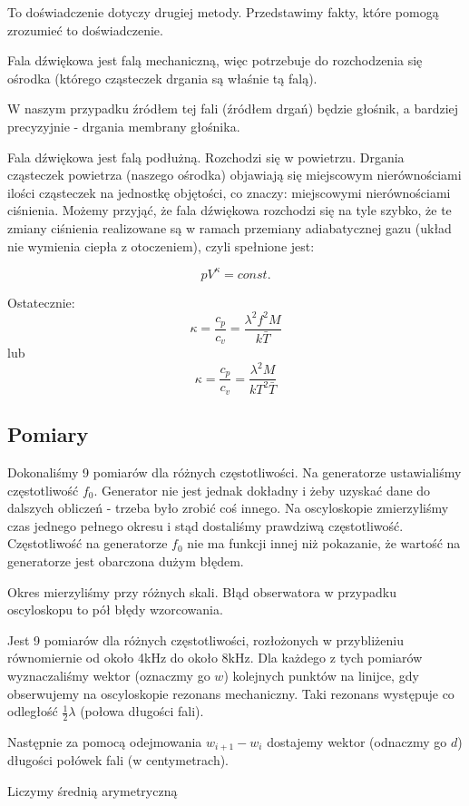 \documentclass[12pt,a4paper]{article}
\begin{document}
To doświadczenie dotyczy drugiej metody. Przedstawimy fakty, które pomogą zrozumieć to doświadczenie.


Fala dźwiękowa jest falą mechaniczną, więc potrzebuje do rozchodzenia się ośrodka (którego cząsteczek drgania są właśnie tą falą).  

W naszym przypadku źródłem tej fali (źródłem drgań) będzie głośnik, a bardziej precyzyjnie - drgania membrany głośnika. 

Fala dźwiękowa jest falą podłużną. Rozchodzi się w powietrzu. Drgania cząsteczek powietrza (naszego ośrodka) objawiają się miejscowym nierównościami ilości cząsteczek na jednostkę objętości, co znaczy: miejscowymi nierównościami ciśnienia.
Możemy przyjąć, że fala dźwiękowa rozchodzi się na tyle szybko, że te zmiany ciśnienia realizowane są w ramach przemiany adiabatycznej gazu (układ nie wymienia ciepła z otoczeniem), czyli spełnione jest: 

$$
pV^\kappa = const.
$$


Ostatecznie:
$$
\kappa = \frac{c_p}{c_v} = \frac{\lambda^2 f^2 M}{k\bar{T}}
$$
lub
$$
\kappa = \frac{c_p}{c_v} = \frac{\lambda^2 M}{k T^2 \bar{T}}
$$


\subsection{Pomiary}
Dokonaliśmy 9 pomiarów dla różnych częstotliwości. Na generatorze ustawialiśmy częstotliwość $f_0$. Generator nie jest jednak dokładny i żeby uzyskać dane do dalszych obliczeń - trzeba było zrobić coś innego. Na oscyloskopie zmierzyliśmy czas jednego pełnego okresu i stąd dostaliśmy prawdziwą częstotliwość. Częstotliwość na generatorze $f_0$ nie ma funkcji innej niż pokazanie, że wartość na generatorze jest obarczona dużym błędem. 

Okres mierzyliśmy przy różnych skali. Błąd obserwatora w przypadku oscyloskopu to pół błędy wzorcowania.

Jest 9 pomiarów dla różnych częstotliwości, rozłożonych w przybliżeniu równomiernie od około 4kHz do około 8kHz. 
Dla każdego z tych pomiarów wyznaczaliśmy wektor (oznaczmy go $w$) kolejnych punktów na linijce, gdy obserwujemy na oscyloskopie rezonans mechaniczny. Taki rezonans występuje co odległość $\frac{1}{2}\lambda$ (połowa długości fali). 

Następnie za pomocą odejmowania $w_{i+1}-w_i$  dostajemy wektor (odnaczmy go $d$) długości połówek fali (w centymetrach). 

Liczymy średnią arymetryczną 
\end{document}
